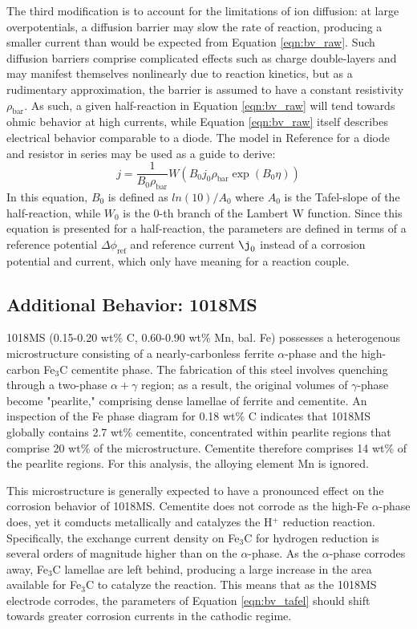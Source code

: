 The third modification is to account for the limitations of ion diffusion: at large overpotentials, a diffusion barrier may slow the rate of reaction, producing a smaller current than would be expected from Equation \ref{eqn:bv_raw}.  Such diffusion barriers comprise complicated effects such as charge double-layers and may manifest themselves nonlinearly due to reaction kinetics, but as a rudimentary approximation, the barrier is assumed to have a constant resistivity $\rho_{\text{bar}}$.  As such, a given half-reaction in Equation \ref{eqn:bv_raw} will tend towards ohmic behavior at high currents, while Equation \ref{eqn:bv_raw} itself describes electrical behavior comparable to a diode.  The model in Reference \cite{} for a diode and resistor in series may be used as a guide to derive:
%
	\begin{equation}
		j = \frac{1}{B_0 \rho_{\text{bar}}}
		W(B_0 j_0 \rho_{\text{bar}} \exp(B_0 \eta))
	\label{eqn:bv_w}
	\end{equation}
%
In this equation, $B_0$ is defined as $ln(10) / A_0$ where $A_0$ is the Tafel-slope of the half-reaction, while $W_0$ is the 0-th branch of the Lambert W function.  Since this equation is presented for a half-reaction, the parameters are defined in terms of a reference potential $\Delta \phi_{\text{ref}}$ and reference current $\j_0$ instead of a corrosion potential and current, which only have meaning for a reaction couple.

\subsection{Additional Behavior: 1018MS}

1018MS (0.15-0.20 wt\% C, 0.60-0.90 wt\% Mn, bal. Fe) possesses a heterogenous microstructure consisting of a nearly-carbonless ferrite $\alpha$-phase and the high-carbon Fe$_3$C cementite phase.  The fabrication of this steel involves quenching through a two-phase $\alpha + \gamma$ region; as a result, the original volumes of $\gamma$-phase become "pearlite," comprising dense lamellae of ferrite and cementite.  An inspection of the Fe phase diagram for 0.18 wt\% C indicates that 1018MS globally contains 2.7 wt\% cementite, concentrated within pearlite regions that comprise 20 wt\% of the microstructure.  Cementite therefore comprises 14 wt\% of the pearlite regions.  For this analysis, the alloying element Mn is ignored.

This microstructure is generally expected to have a pronounced effect on the corrosion behavior of 1018MS.  Cementite does not corrode as the high-Fe $\alpha$-phase does, yet it comducts metallically and catalyzes the H$^+$ reduction reaction.  Specifically, the exchange current density on Fe$_3$C for hydrogen reduction is several orders of magnitude higher than on the $\alpha$-phase.  As the $\alpha$-phase corrodes away, Fe$_3$C lamellae are left behind, producing a large increase in the area available for Fe$_3$C to catalyze the reaction.  This means that as the 1018MS electrode corrodes, the parameters of Equation \ref{eqn:bv_tafel} should shift towards greater corrosion currents in the cathodic regime.

